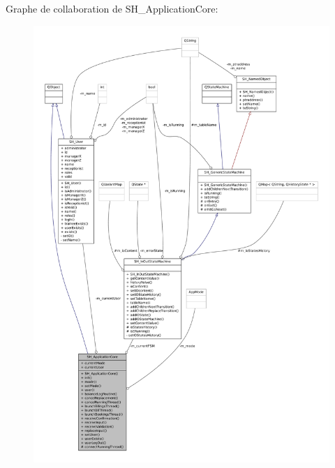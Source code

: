 Graphe de collaboration de S\-H\-\_\-\-Application\-Core\-:
\nopagebreak
\begin{figure}[H]
\begin{center}
\leavevmode
\includegraphics[width=350pt]{classSH__ApplicationCore__coll__graph}
\end{center}
\end{figure}
